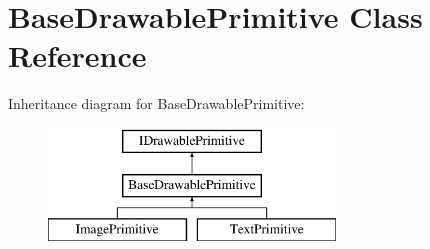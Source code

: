 \hypertarget{classBaseDrawablePrimitive}{}\section{Base\+Drawable\+Primitive Class Reference}
\label{classBaseDrawablePrimitive}
Inheritance diagram for Base\+Drawable\+Primitive\+:\begin{figure}[H]
\begin{center}
\leavevmode
\includegraphics[height=3.000000cm]{classBaseDrawablePrimitive}
\end{center}
\end{figure}
